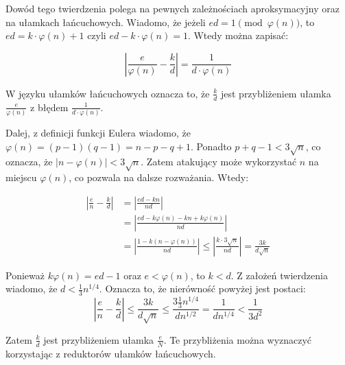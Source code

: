 \documentclass[12pt,twoside,a4]{mwbk}
\theoremstyle{definition}
\begin{document}
Dowód tego twierdzenia polega na pewnych zależnościach aproksymacyjny oraz na ułamkach łańcuchowych. Wiadomo, że jeżeli $ed = 1 \pmod{\varphi(n)}$, to\linebreak$ed = k \cdot \varphi(n) + 1$ czyli $ed - k \cdot \varphi(n) = 1$. Wtedy można zapisać:

\[ \left\lvert \frac{e}{\varphi(n)} - \frac{k}{d} \right\rvert = \frac{1}{d \cdot \varphi(n)}\]

W języku ułamków łańcuchowych oznacza to, że $\frac{k}{d}$ jest przybliżeniem ułamka $\frac{e}{\varphi(n)}$ z błędem $\frac{1}{d \cdot \varphi(n)}$. \\ \par

Dalej, z definicji funkcji Eulera wiadomo, że $\varphi(n) = (p-1)(q-1) = n - p - q + 1$. Ponadto $p + q - 1 < 3 \sqrt{n}$, co oznacza, że $\lvert n - \varphi(n) \rvert < 3 \sqrt{n}$. Zatem atakujący może wykorzystać $n$ na miejscu $\varphi(n)$, co pozwala na dalsze rozważania. Wtedy:

\begin{equation*} \begin{aligned}
\left\lvert \frac{e}{n} - \frac{k}{d} \right\rvert &= \left\lvert \frac{ed - kn}{nd} \right\rvert  \\
&= \left\vert \frac{ed - k\varphi(n) - kn + k\varphi(n)}{nd} \right\rvert \\
&= \left\lvert \frac{1 - k(n - \varphi(n))}{nd} \right\rvert \leq \left\lvert \frac{k \cdot 3 \sqrt{n}}{nd} \right\rvert = \frac{3k}{d\sqrt{n}}
\end{aligned} \end{equation*}

Ponieważ $k\varphi(n) = ed - 1$ oraz $e < \varphi(n)$, to $k < d$. Z założeń twierdzenia wiadomo, że $d < \frac{1}{3}n^{1/4}$. Oznacza to, że nierówność powyżej jest postaci:
\[ \left\lvert \frac{e}{n} - \frac{k}{d} \right\rvert \leq \frac{3k}{d\sqrt{n}} \leq \frac{3 \frac{1}{3} n^{1/4}}{d n^{1/2}} = \frac{1}{d n^{1/4}} < \frac{1}{3d^2}\]

Zatem $\frac{k}{d}$ jest przybliżeniem ułamka $\frac{e}{N}$. Te przybliżenia można wyznaczyć korzystając z reduktorów ułamków łańcuchowych.
\end{document}
